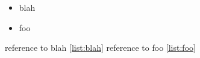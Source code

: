 \documentclass{article}
\begin{document}
\begin{itemize}
\item blah \label{list:blah}

\pagebreak

\item foo \label{list:foo}

\pagebreak
\end{itemize}

reference to blah \ref{list:blah}
\pagebreak
reference to foo \ref{list:foo}
\end{document}

